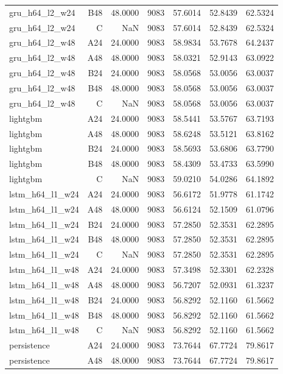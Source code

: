 \begin{table}[htbp]
\begin{tabular}{lrrrrrr}
gru\_h64\_l2\_w24 & B48 & 48.0000 & 9083 & 57.6014 & 52.8439 & 62.5324 \\
gru\_h64\_l2\_w24 & C & NaN & 9083 & 57.6014 & 52.8439 & 62.5324 \\
gru\_h64\_l2\_w48 & A24 & 24.0000 & 9083 & 58.9834 & 53.7678 & 64.2437 \\
gru\_h64\_l2\_w48 & A48 & 48.0000 & 9083 & 58.0321 & 52.9143 & 63.0922 \\
gru\_h64\_l2\_w48 & B24 & 24.0000 & 9083 & 58.0568 & 53.0056 & 63.0037 \\
gru\_h64\_l2\_w48 & B48 & 48.0000 & 9083 & 58.0568 & 53.0056 & 63.0037 \\
gru\_h64\_l2\_w48 & C & NaN & 9083 & 58.0568 & 53.0056 & 63.0037 \\
lightgbm & A24 & 24.0000 & 9083 & 58.5441 & 53.5767 & 63.7193 \\
lightgbm & A48 & 48.0000 & 9083 & 58.6248 & 53.5121 & 63.8162 \\
lightgbm & B24 & 24.0000 & 9083 & 58.5693 & 53.6806 & 63.7790 \\
lightgbm & B48 & 48.0000 & 9083 & 58.4309 & 53.4733 & 63.5990 \\
lightgbm & C & NaN & 9083 & 59.0210 & 54.0286 & 64.1892 \\
lstm\_h64\_l1\_w24 & A24 & 24.0000 & 9083 & 56.6172 & 51.9778 & 61.1742 \\
lstm\_h64\_l1\_w24 & A48 & 48.0000 & 9083 & 56.6124 & 52.1509 & 61.0796 \\
lstm\_h64\_l1\_w24 & B24 & 24.0000 & 9083 & 57.2850 & 52.3531 & 62.2895 \\
lstm\_h64\_l1\_w24 & B48 & 48.0000 & 9083 & 57.2850 & 52.3531 & 62.2895 \\
lstm\_h64\_l1\_w24 & C & NaN & 9083 & 57.2850 & 52.3531 & 62.2895 \\
lstm\_h64\_l1\_w48 & A24 & 24.0000 & 9083 & 57.3498 & 52.3301 & 62.2328 \\
lstm\_h64\_l1\_w48 & A48 & 48.0000 & 9083 & 56.7207 & 52.0931 & 61.3237 \\
lstm\_h64\_l1\_w48 & B24 & 24.0000 & 9083 & 56.8292 & 52.1160 & 61.5662 \\
lstm\_h64\_l1\_w48 & B48 & 48.0000 & 9083 & 56.8292 & 52.1160 & 61.5662 \\
lstm\_h64\_l1\_w48 & C & NaN & 9083 & 56.8292 & 52.1160 & 61.5662 \\
persistence & A24 & 24.0000 & 9083 & 73.7644 & 67.7724 & 79.8617 \\
persistence & A48 & 48.0000 & 9083 & 73.7644 & 67.7724 & 79.8617 \\

\end{tabular}
\end{table}
